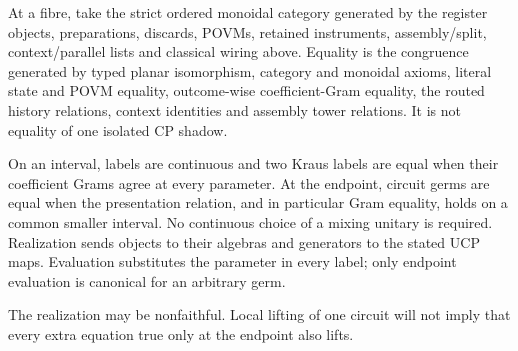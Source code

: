 \begin{definition}
At a fibre, take the strict ordered monoidal category generated by the
register objects, preparations, discards, POVMs, retained instruments,
assembly/split, context/parallel lists and classical wiring above.  Equality
is the congruence generated by typed planar isomorphism, category and monoidal
axioms, literal state and POVM equality, outcome-wise coefficient-Gram
equality, the routed history relations, context identities and assembly
tower relations.  It is not equality of one isolated CP shadow.

On an interval, labels are continuous and two Kraus labels are equal when
their coefficient Grams agree at every parameter.  At the endpoint, circuit
germs are equal when the presentation relation, and in particular Gram
equality, holds on a common smaller interval.  No continuous choice of a
mixing unitary is required.  Realization sends objects to their algebras and
generators to the stated UCP maps.  Evaluation substitutes the parameter in
every label; only endpoint evaluation is canonical for an arbitrary germ.
\end{definition}
\begin{scope}
The realization may be nonfaithful.  Local lifting of one circuit will not
imply that every extra equation true only at the endpoint also lifts.
\end{scope}


